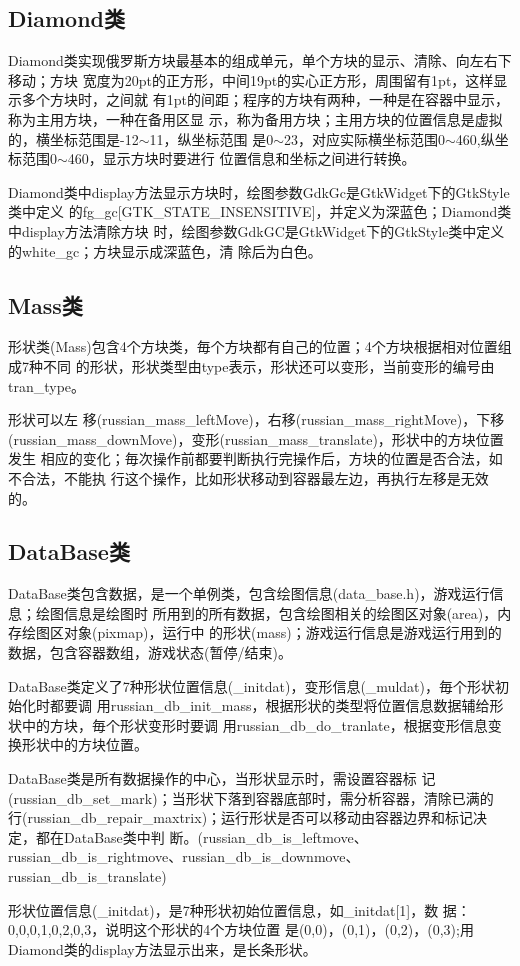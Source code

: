 \subsection{Diamond类}

Diamond类实现俄罗斯方块最基本的组成单元，单个方块的显示、清除、向左右下移动；方块
宽度为20pt的正方形，中间19pt的实心正方形，周围留有1pt，这样显示多个方块时，之间就
有1pt的间距；程序的方块有两种，一种是在容器中显示，称为主用方块，一种在备用区显
示，称为备用方块；主用方块的位置信息是虚拟的，横坐标范围是-12$\sim$11，纵坐标范围
是0$\sim$23，对应实际横坐标范围0$\sim$460,纵坐标范围0$\sim$460，显示方块时要进行
位置信息和坐标之间进行转换。

Diamond类中display方法显示方块时，绘图参数GdkGc是GtkWidget下的GtkStyle类中定义
的fg\_gc[GTK\_STATE\_INSENSITIVE]，并定义为深蓝色；Diamond类中display方法清除方块
时，绘图参数GdkGC是GtkWidget下的GtkStyle类中定义的white\_gc；方块显示成深蓝色，清
除后为白色。

\subsection{Mass类}

形状类(Mass)包含4个方块类，毎个方块都有自己的位置；4个方块根据相对位置组成7种不同
的形状，形状类型由type表示，形状还可以变形，当前变形的编号由tran\_type。

形状可以左
移(russian\_mass\_leftMove)，右移(russian\_mass\_rightMove)，下移
(russian\_mass\_downMove)，变形(russian\_mass\_translate)，形状中的方块位置发生
相应的变化；毎次操作前都要判断执行完操作后，方块的位置是否合法，如不合法，不能执
行这个操作，比如形状移动到容器最左边，再执行左移是无效的。

\subsection{DataBase类}

DataBase类包含数据，是一个单例类，包含绘图信息(data\_base.h)，游戏运行信息；绘图信息是绘图时
所用到的所有数据，包含绘图相关的绘图区对象(area)，内存绘图区对象(pixmap)，运行中
的形状(mass)；游戏运行信息是游戏运行用到的数据，包含容器数组，游戏状态(暂停/结束)。

DataBase类定义了7种形状位置信息(\_initdat)，变形信息(\_muldat)，毎个形状初始化时都要调
用russian\_db\_init\_mass，根据形状的类型将位置信息数据辅给形状中的方块，毎个形状变形时要调
用russian\_db\_do\_tranlate，根据变形信息变换形状中的方块位置。

DataBase类是所有数据操作的中心，当形状显示时，需设置容器标
记(russian\_db\_set\_mark)；当形状下落到容器底部时，需分析容器，清除已满的
行(russian\_db\_repair\_maxtrix)；运行形状是否可以移动由容器边界和标记决
定，都在DataBase类中判
断。(russian\_db\_is\_leftmove、russian\_db\_is\_rightmove、russian\_db\_is\_downmove、
russian\_db\_is\_translate)


形状位置信息(\_initdat)，是7种形状初始位置信息，如\_initdat[1]，数
据：0,0,0,1,0,2,0,3，说明这个形状的4个方块位置
是(0,0)，(0,1)，(0,2)，(0,3);用Diamond类的display方法显示出来，是长条形状。


